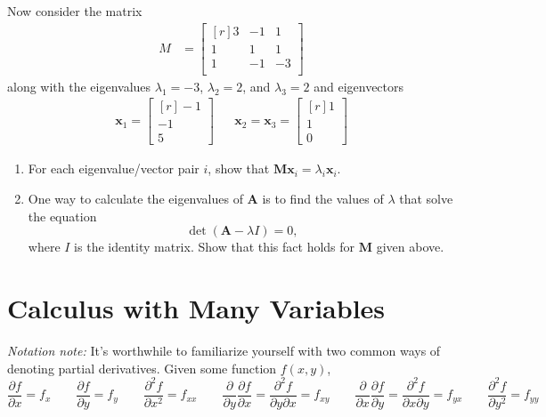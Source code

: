 \documentclass[10pt]{amsart}
\begin{document}
Now consider the matrix
\begin{align*}
M &= \left[\begin{matrix*}[r]
3 & -1 & 1 \\
1 & 1 & 1 \\
1 & -1 & -3 \\
\end{matrix*}\right]
\end{align*}
along with the eigenvalues $\lambda_1 = -3$, $\lambda_2 = 2$, and $\lambda_3 = 2$ and eigenvectors 
\begin{align*}
\mathbf{x}_1 = \left[\begin{matrix*}[r]
-1 \\ -1 \\ 5
\end{matrix*}\right]   & &
\mathbf{x}_2 = \mathbf{x}_3 = \left[\begin{matrix*}[r]
1 \\ 1\\ 0
\end{matrix*}\right]
\end{align*}

\begin{enumerate}
	\item For each eigenvalue/vector pair $i$, show that $\mathbf{M} \mathbf{x}_i = \lambda_i \mathbf{x}_i$. 
	
	\item One way to calculate the eigenvalues of $\mathbf{A}$ is to find the values of $\lambda$ that solve the equation $$\det(\mathbf{A} - \lambda I) = 0,$$ where $I$ is the identity matrix. Show that this fact holds for $\mathbf{M}$ given above. 
\end{enumerate}





\bigskip

\section{Calculus with Many Variables}

\textit{Notation note:} It's worthwhile to familiarize yourself with two common ways of denoting partial derivatives. Given some function $f(x,y)$, 
\begin{equation*}\frac{\partial f}{\partial x} = f_x \qquad \frac{\partial f}{\partial y} = f_y \qquad \frac{\partial^2 f}{\partial x^2} = f_{xx} \qquad \frac{\partial}{\partial y} \frac{\partial f}{\partial x} = \frac{\partial^2 f}{\partial y \partial x} = f_{xy} \qquad \frac{\partial}{\partial x} \frac{\partial f}{\partial y} = \frac{\partial^2 f}{\partial x \partial y} = f_{yx} \qquad \frac{\partial^2 f}{\partial y^2} = f_{yy}\end{equation*}
\end{document}
